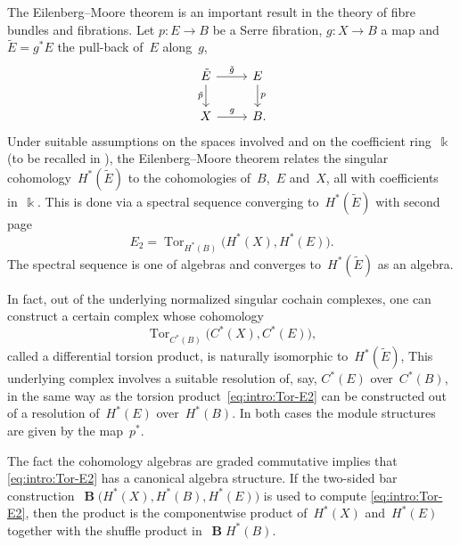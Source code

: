\documentclass[letterpaper]{amsart}
\numberwithin{equation}{section}
\theoremstyle{plain}
\theoremstyle{definition}
\theoremstyle{remark}
\DeclareMathOperator{\Tor}{Tor}
\DeclareMathOperator{\BB}{\mathbf{B}}
\def\kk{\Bbbk}
\def\gE{\tilde{E}}
\def\gp{\tilde{p}}
\begin{document}
The Eilenberg--Moore theorem is an important result in the theory of fibre bundles and fibrations.
Let $p\colon E\to B$ be a Serre fibration, $g\colon X\to B$ a map and $\gE=g^{*}E$ the pull-back of~$E$ along~$g$,
\begin{equation}
  \label{eq:intro:pull-back}
  \begin{tikzcd}
    \gE \arrow{d}[left]{\gp} \arrow{r}{\tilde{g}} & E \arrow{d}{p} \\
    X \arrow{r}{g} & B \mathrlap{.}
  \end{tikzcd}
\end{equation}
Under suitable assumptions on the spaces involved and on the coefficient ring~$\kk$
(to be recalled in ), the Eilenberg--Moore theorem
relates the singular cohomology~$H^{*}(\gE)$ to the cohomologies of~$B$,~$E$ and~$X$,
all with coefficients in~$\kk$.
This is done via a spectral sequence converging to~$H^{*}(\gE)$ with second page
\begin{equation}
  \label{eq:intro:Tor-E2}
  E_{2} = \Tor_{H^{*}(B)}\bigl(H^{*}(X),H^{*}(E)\bigr).
\end{equation}
The spectral sequence is one of algebras and converges to~$H^{*}(\gE)$ as an algebra.

In fact, out of the underlying normalized singular cochain complexes, one can construct a certain complex
whose cohomology
\begin{equation}
  \label{eq:intro:Tor}
  \Tor_{C^{*}(B)}\bigl(C^{*}(X),C^{*}(E)\bigr),
\end{equation}
 called a differential torsion product, is naturally isomorphic to~$H^{*}(\gE)$,
This underlying complex involves a suitable resolution of, say, $C^{*}(E)$ over~$C^{*}(B)$,
in the same way as the torsion product~\eqref{eq:intro:Tor-E2} can be constructed out of a resolution
of~$H^{*}(E)$ over~$H^{*}(B)$. In both cases the module structures are given by the map~$p^{*}$.

The fact the cohomology algebras are graded commutative implies that \eqref{eq:intro:Tor-E2} has
a canonical algebra structure.
If the two-sided bar construction~$\BB\bigl(H^{*}(X),H^{*}(B),H^{*}(E)\bigr)$ is used to compute \eqref{eq:intro:Tor-E2},
then the product is the componentwise product of~$H^{*}(X)$ and~$H^{*}(E)$ together with the shuffle product
in~$\BB H^{*}(B)$.
\end{document}
